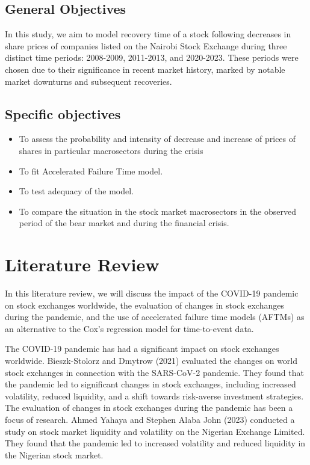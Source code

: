 \documentclass[twoside,a4paper,12pt]{article}
\begin{document}
\subsection*{General Objectives}In this study, we aim to model  recovery time of a stock following decreases in share prices of companies listed on the Nairobi Stock Exchange during three distinct time periods: 2008-2009, 2011-2013, and 2020-2023. These periods were chosen due to their significance in recent market history, marked by notable market downturns and subsequent recoveries.
\subsection*{Specific objectives}
\begin{itemize}
	\item To assess the probability and intensity of decrease and increase of 
prices of shares in particular macrosectors during the crisis 
	\item To fit   Accelerated Failure Time model.
	\item  To test adequacy of the model.
	

	\item To compare the situation in the stock market macrosectors in the 
observed period of the bear market  and during the financial crisis.

	
	
	
\end{itemize}

\section*{Literature Review}
In this literature review, we will discuss the impact of the COVID-19 pandemic on stock exchanges worldwide, the evaluation of changes in stock exchanges during the pandemic, and the use of accelerated failure time models (AFTMs) as an alternative to the Cox's regression model for time-to-event data.

\noindent The COVID-19 pandemic has had a significant impact on stock exchanges worldwide. Bieszk-Stolorz and Dmytrow (2021) evaluated the changes on world stock exchanges in connection with the SARS-CoV-2 pandemic. They found that the pandemic led to significant changes in stock exchanges, including increased volatility, reduced liquidity, and a shift towards risk-averse investment strategies.
\noindent The evaluation of changes in stock exchanges during the pandemic has been a focus of research. Ahmed Yahaya and Stephen Alaba John (2023) conducted a study on stock market liquidity and volatility on the Nigerian Exchange Limited. They found that the pandemic led to increased volatility and reduced liquidity in the Nigerian stock market.
\end{document}
